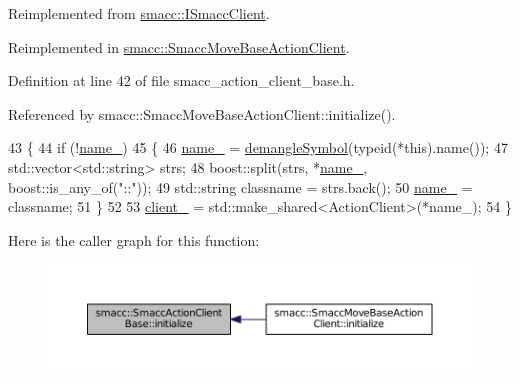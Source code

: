 Reimplemented from \hyperlink{classsmacc_1_1ISmaccClient_a974ebb6ad6cf812e7b9de6b78b3d901f}{smacc\+::\+I\+Smacc\+Client}.



Reimplemented in \hyperlink{classsmacc_1_1SmaccMoveBaseActionClient_ae520045638a5f722ad1367f6d705b7c4}{smacc\+::\+Smacc\+Move\+Base\+Action\+Client}.



Definition at line 42 of file smacc\+\_\+action\+\_\+client\+\_\+base.\+h.



Referenced by smacc\+::\+Smacc\+Move\+Base\+Action\+Client\+::initialize().


\begin{DoxyCode}
43     \{
44         \textcolor{keywordflow}{if} (!\hyperlink{classsmacc_1_1SmaccActionClientBase_a7fa0e4b63069bea12d47a83bd0be73d7}{name\_})
45         \{
46             \hyperlink{classsmacc_1_1SmaccActionClientBase_a7fa0e4b63069bea12d47a83bd0be73d7}{name\_} = \hyperlink{namespacesmacc_a458f5e70d468824fbcd66cc7729deaa8}{demangleSymbol}(\textcolor{keyword}{typeid}(*this).name());
47             std::vector<std::string> strs;
48             boost::split(strs, *\hyperlink{classsmacc_1_1SmaccActionClientBase_a7fa0e4b63069bea12d47a83bd0be73d7}{name\_}, boost::is\_any\_of(\textcolor{stringliteral}{"::"}));
49             std::string classname = strs.back();
50             \hyperlink{classsmacc_1_1SmaccActionClientBase_a7fa0e4b63069bea12d47a83bd0be73d7}{name\_} = classname;
51         \}
52 
53         \hyperlink{classsmacc_1_1SmaccActionClientBase_a5ec5c74015ea4e8b61d017f666a4ce17}{client\_} = std::make\_shared<ActionClient>(*name\_);
54     \}
\end{DoxyCode}


Here is the caller graph for this function\+:
\nopagebreak
\begin{figure}[H]
\begin{center}
\leavevmode
\includegraphics[width=350pt]{classsmacc_1_1SmaccActionClientBase_a717b234a3e26ea778cce7635fb924e59_icgraph}
\end{center}
\end{figure}



